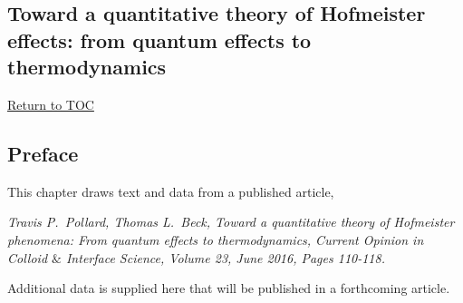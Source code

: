 \begin{sie}
 \chapter{Toward a quantitative theory of Hofmeister effects: from quantum effects to thermodynamics}
 \hyperlink{toc}{Return to TOC}
  \section{\label{ch3:sec0:level1}Preface}
  This chapter draws text and data from a published article,
  
  \vspace{12pt}
  \noindent \emph{Travis P.~Pollard, Thomas L.~Beck, Toward a quantitative theory of Hofmeister phenomena: From quantum effects to 
  thermodynamics, Current Opinion in Colloid $\&$ Interface Science, Volume 23, June 2016, Pages 110-118.}
  \vspace{12pt}
  
  \noindent Additional data is supplied here that will be published in a forthcoming article. 
  

\end{sie}
